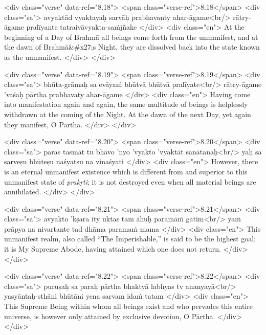 \begin{html}
<div class="verse" data-ref="8.18">
  <span class="verse-ref">8.18</span>
  <div class="sa">
    avyaktād vyaktayaḥ sarvāḥ prabhavanty ahar-āgame<br/>
    rātry-āgame pralīyante tatraivāvyakta-saṁjñake
  </div>
  <div class="en">
    At the beginning of a Day of Brahmā all beings come forth from the unmanifest, and at the dawn of Brahmā&#x27;s Night, they are dissolved back into the state known as the unmanifest.
  </div>
</div>
\end{html}



\begin{html}
<div class="verse" data-ref="8.19">
  <span class="verse-ref">8.19</span>
  <div class="sa">
    bhūta-grāmaḥ sa evāyaṁ bhūtvā bhūtvā pralīyate<br/>
    rātry-āgame ’vaśaḥ pārtha prabhavaty ahar-āgame
  </div>
  <div class="en">
    Having come into manifestation again and again, the same multitude of beings is helplessly withdrawn at the coming of the Night. At the dawn of the next Day, yet again they manifest, O Pārtha.
  </div>
</div>
\end{html}



\begin{html}
<div class="verse" data-ref="8.20">
  <span class="verse-ref">8.20</span>
  <div class="sa">
    paras tasmāt tu bhāvo ’nyo ’vyakto ’vyaktāt sanātanaḥ<br/>
    yaḥ sa sarveṣu bhūteṣu naśyatsu na vinaśyati
  </div>
  <div class="en">
    However, there is an eternal unmanifest existence which is different from and superior to this unmanifest state of \textit{prakṛti}; it is not destroyed even when all material beings are annihilated.
  </div>
</div>
\end{html}



\begin{html}
<div class="verse" data-ref="8.21">
  <span class="verse-ref">8.21</span>
  <div class="sa">
    avyakto ’kṣara ity uktas tam āhuḥ paramāṁ gatim<br/>
    yaṁ prāpya na nivartante tad dhāma paramaṁ mama
  </div>
  <div class="en">
    This unmanifest realm, also called \enquote{The Imperishable,} is said to be the highest goal; it is My Supreme Abode, having attained which one does not return.
  </div>
</div>
\end{html}



\begin{html}
<div class="verse" data-ref="8.22">
  <span class="verse-ref">8.22</span>
  <div class="sa">
    puruṣaḥ sa paraḥ pārtha bhaktyā labhyas tv ananyayā<br/>
    yasyāntaḥ-sthāni bhūtāni yena sarvam idaṁ tatam
  </div>
  <div class="en">
    This Supreme Being within whom all beings exist and who pervades this entire universe, is however only attained by exclusive devotion, O Pārtha.
  </div>
</div>
\end{html}



